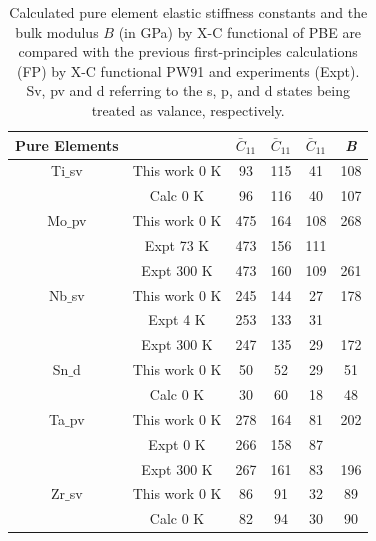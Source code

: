 \newpage
\begin{table}[H]
	\caption{Calculated pure element elastic stiffness constants and the bulk modulus $B$ (in GPa) by X-C functional of PBE are compared with the previous first-principles calculations (FP) by X-C functional PW91 and experiments (Expt). Sv, pv and d referring to the s, p, and d states being treated as valance, respectively.}
	\centering
	\begin{tabular}{ c c c c c c }
		\hline
		Pure Elements & & $\bar{C}_{11}$ & $\bar{C}_{11}$  & $\bar{C}_{11}$ & \textit{B}\\
		\hline
		Ti$\_$sv & This work 0 K & 93 & 115 & 41 & 108\\
		& Calc 0 K \cite{Shang2010b} & 96 & 116 & 40 & 107\\
		Mo$\_$pv & This work 0 K & 475 & 164 & 108 & 268\\
		& Expt 73 K \cite{Simmons1971b} & 473 & 156 & 111 &\\
		& Expt 300 K \cite{Dickinson1967a} & 473 & 160 & 109 & 261\\
		Nb$\_$sv & This work 0 K & 245 & 144 & 27 & 178\\
		& Expt 4 K \cite{Simmons1971b} & 253 & 133 & 31 & \\
		& Expt 300 K \cite{Bolef1961} & 247 & 135 & 29 & 172\\
		Sn$\_$d & This work 0 K & 50 & 52 & 29 & 51\\
		& Calc 0 K \cite{Shang2010b} & 30 & 60 & 18 & 48\\
		Ta$\_$pv & This work 0 K & 278 & 164 & 81 & 202\\
		& Expt 0 K \cite{Simmons1971b} & 266 & 158 & 87 & \\
		& Expt 300 K \cite{Bolef1961} & 267 & 161 & 83 & 196\\
		Zr$\_$sv & This work 0 K & 86 & 91 & 32 & 89\\
		& Calc 0 K \cite{Shang2010b} & 82 & 94 & 30 & 90\\
		\hline
	\end{tabular}
	\label{Ch5-table:pureeleelas}
\end{table}
\clearpage


